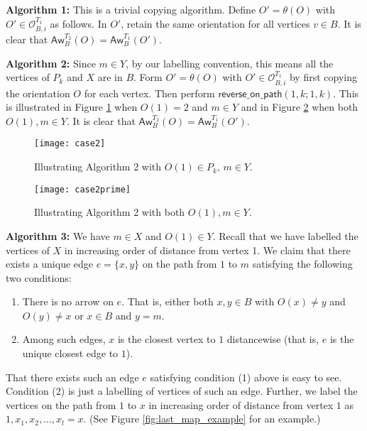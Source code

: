 \documentclass[12pt]{article}
\def\eod{\vrule height 6pt width 5pt depth 0pt}
\newenvironment{proof}{\noindent {\bf Proof:} \hspace{.2em}}
                      {\hspace*{\fill}{\eod}}
\newcommand{\sO}{  \mathcal{ O}}
\newcommand{\revpath}{ \mathsf{reverse\_on\_path}}
\newcommand{\awy}{\mathsf{Aw}}
\begin{document}
\begin{proof}
\textbf{Algorithm 1: }  This is a trivial copying algorithm.  Define
$O' = \theta(O)$ with $O' \in \sO_{B,i}^{T_1}$  as follows.
In $O'$, retain the same orientation for all vertices $v \in B$.  
It is clear that $\awy_B^{T_2}(O) = \awy_B^{T_1}(O')$.

\bigskip
\textbf{Algorithm 2: } Since $m \in Y$, by our labelling convention, this means all the 
vertices of $P_k$ and $X$ are in $B$.  Form $O' = \theta(O)$ with 
$O' \in \sO_{B,i}^{T_1}$ by first copying the 
orientation $O$ for
each vertex.  Then perform $\revpath(1,k;1,k)$.  This is illustrated in Figure \ref{fig:case2}
when $O(1) = 2$ and $m \in Y$ and in Figure \ref{fig:case2prime} when both 
$O(1), m \in Y$.
It is clear that $\awy_B^{T_2}(O) = \awy_B^{T_1}(O')$.

\begin{figure}[h]
\centerline{\texttt{[image: case2]}}
\caption{Illustrating Algorithm 2  with $O(1) \in P_k$, $m \in Y$.}
\label{fig:case2} 
\end{figure}

\begin{figure}[h]
\centerline{\texttt{[image: case2prime]}}
\caption{Illustrating Algorithm 2 with both $O(1),m \in Y$.}
\label{fig:case2prime} 
\end{figure}




\bigskip
\textbf{Algorithm 3: } We have $m \in X$ and $O(1) \in Y$.  Recall that we have labelled 
the vertices of $X$ in increasing order of distance from vertex 1.  We claim that 
there exists a unique edge 
$e = \{x,y\}$ on the path from $1$ to $m$ satisfying the  following two conditions:

\begin{enumerate}
  \item There is no arrow on $e$.  That is, either both $x,y \in B$ with $O(x) \neq y$ and 
	 $O(y) \neq x$ or $x \in B$ and $y = m$.
  \item Among such edges, $x$ is the closest vertex to $1$ 
	 distancewise (that is, $e$ is the unique closest edge to $1$).
\end{enumerate}

That there exists such an edge $e$ satisfying condition (1) above is easy to see.
Condition (2) is just a labelling of vertices of such an edge. 
Further, 
we label
the vertices on the path from $1$ to $x$ in increasing order of distance from
vertex $1$ as $1,x_1,x_2,\ldots,x_l=x$.  (See Figure 
\ref{fig:last_map_example} for an example.)


\end{proof}
\end{document}
